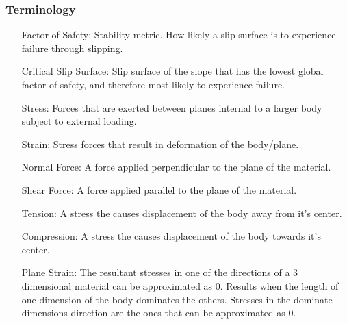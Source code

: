 \documentclass[12pt]{article}
\begin{document}
\subsubsection{Terminology}
\label{Sec:T}
\begin{itemize}
\item[Factor of Safety:]Stability metric. How likely a slip surface is to experience failure through slipping.
\item[Critical Slip Surface:]Slip surface of the slope that has the lowest global factor of safety, and therefore most likely to experience failure.
\item[Stress:]Forces that are exerted between planes internal to a larger body subject to external loading.
\item[Strain:]Stress forces that result in deformation of the body/plane.
\item[Normal Force:]A force applied perpendicular to the plane of the material.
\item[Shear Force:]A force applied parallel to the plane of the material.
\item[Tension:]A stress the causes displacement of the body away from it's center.
\item[Compression:]A stress the causes displacement of the body towards it's center.
\item[Plane Strain:]The resultant stresses in one of the directions of a 3 dimensional material can be approximated as 0. Results when the length of one dimension of the body dominates the others. Stresses in the dominate dimensions direction are the ones that can be approximated as 0.
\end{itemize}
\end{document}
